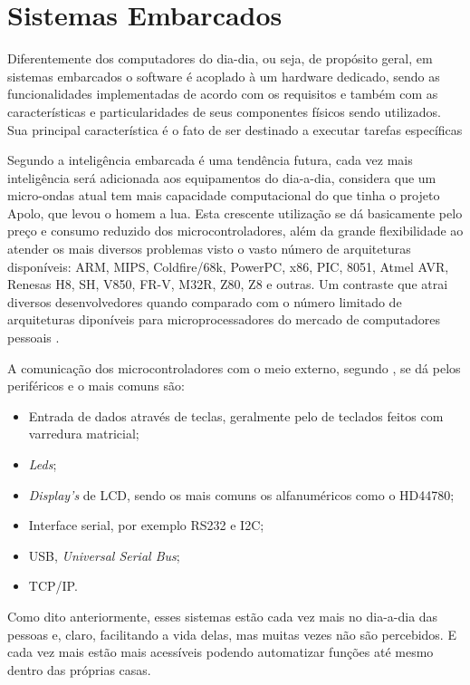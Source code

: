 \chapter{Sistemas Embarcados}
\label{cap:sis_embarcados}
Diferentemente dos computadores do dia-dia, ou seja, de propósito geral, em sistemas embarcados o software é acoplado à um hardware dedicado, sendo as funcionalidades implementadas de acordo com os requisitos e também com as características e particularidades de seus componentes físicos sendo utilizados. Sua principal característica é o fato de ser destinado a executar tarefas específicas \cite{li2003real}

Segundo \cite{cunha2013} a inteligência embarcada é uma tendência futura, cada vez mais inteligência será adicionada aos equipamentos do dia-a-dia, considera que um micro-ondas atual tem mais capacidade computacional do que tinha o projeto Apolo, que levou o homem a lua. Esta crescente utilização se dá basicamente pelo preço e consumo reduzido dos microcontroladores, além da grande flexibilidade ao atender os mais diversos problemas visto o vasto número de arquiteturas disponíveis: ARM, MIPS, Coldfire/68k, PowerPC, x86, PIC, 8051, Atmel AVR, Renesas H8, SH, V850, FR-V, M32R, Z80, Z8 e outras. Um contraste que atrai diversos desenvolvedores quando comparado com o número limitado de arquiteturas diponíveis para microprocessadores do mercado de computadores pessoais \cite{germano2011}.

A comunicação dos microcontroladores com o meio externo, segundo \cite{germano2011}, se dá pelos periféricos e o mais comuns são:
\begin{itemize}
\item Entrada de dados através de teclas, geralmente pelo de teclados feitos com varredura matricial;
\item \emph{Leds};
\item \emph{Display’s} de LCD, sendo os mais comuns os alfanuméricos como o HD44780;
\item Interface serial, por exemplo RS232 e I2C;
\item USB, \emph{Universal Serial Bus};
\item TCP/IP.
\end{itemize}

Como dito anteriormente, esses sistemas estão cada vez mais no dia-a-dia das pessoas e, claro, facilitando a vida delas, mas muitas vezes não são percebidos. E cada vez mais estão mais acessíveis podendo automatizar funções até mesmo dentro das próprias casas. %

